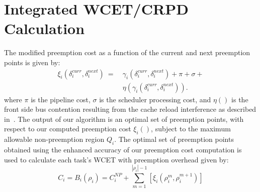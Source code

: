 \vspace{-5pt}
\section{Integrated WCET/CRPD Calculation}\label{sec:schedulability_analysis}

The modified preemption cost as a function of the current and next preemption points is given by:
\begin{equation}\label{eqn:prempt-cost}
\begin{split}
    \xi_{i}(\delta_{i}^{curr},\delta_{i}^{next})\ =\ &\gamma_{i}(\delta_{i}^{curr},\delta_{i}^{next}) + \pi + \sigma + \\ &\eta(\gamma_{i}(\delta_{i}^{curr},\delta_{i}^{next})).
\end{split}
\end{equation}
%
\noindent
where \begin{math}\pi\end{math} is the pipeline cost, \begin{math}\sigma\end{math} is the scheduler processing cost, and \begin{math}\eta()\end{math} is the front side bus contention resulting from the cache reload interference as described in~\cite{pellizzoni:07,pellizzoni:08,pellizzoni:11}.
%
The output of our algorithm is an optimal set of preemption points, with respect to our computed preemption cost $\xi_i()$, subject to the maximum allowable non-preemption region \begin{math}Q_{i}\end{math}.  The optimal set of preemption points obtained using the enhanced accuracy of our preemption cost computation is used to calculate each task's WCET with preemption overhead given by:
\begin{equation}\label{eqn:wcet-cost}
   C_{i} = B_{i}(\rho_{i}) = C_{i}^{NP} + \sum_{m=1}^{|\rho_{i}|-1} [\xi_{i}(\rho_{i}^{m},\rho_{i}^{m+1})]
\end{equation}
\noindent
